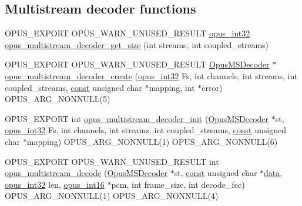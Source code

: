 \subsection*{Multistream decoder functions}
\begin{DoxyCompactItemize}
\item 
O\+P\+U\+S\+\_\+\+E\+X\+P\+O\+RT O\+P\+U\+S\+\_\+\+W\+A\+R\+N\+\_\+\+U\+N\+U\+S\+E\+D\+\_\+\+R\+E\+S\+U\+LT \hyperlink{opus__types_8h_aa4d309d6f80b99dbabebc8f98879ab9a}{opus\+\_\+int32} \hyperlink{group__opus__multistream_gad4e534e2ee78039fff01cd0c6f7c1dd1}{opus\+\_\+multistream\+\_\+decoder\+\_\+get\+\_\+size} (int streams, int coupled\+\_\+streams)
\item 
O\+P\+U\+S\+\_\+\+E\+X\+P\+O\+RT O\+P\+U\+S\+\_\+\+W\+A\+R\+N\+\_\+\+U\+N\+U\+S\+E\+D\+\_\+\+R\+E\+S\+U\+LT \hyperlink{group__opus__multistream_gad3497495deb9a8ace82e76cd4f93e0e4}{Opus\+M\+S\+Decoder} $\ast$ \hyperlink{group__opus__multistream_ga0dc5378a3d4c65498cf530e450b56aa1}{opus\+\_\+multistream\+\_\+decoder\+\_\+create} (\hyperlink{opus__types_8h_aa4d309d6f80b99dbabebc8f98879ab9a}{opus\+\_\+int32} Fs, int channels, int streams, int coupled\+\_\+streams, \hyperlink{zconf_8h_a2c212835823e3c54a8ab6d95c652660e}{const} unsigned char $\ast$mapping, int $\ast$error) O\+P\+U\+S\+\_\+\+A\+R\+G\+\_\+\+N\+O\+N\+N\+U\+LL(5)
\item 
O\+P\+U\+S\+\_\+\+E\+X\+P\+O\+RT int \hyperlink{group__opus__multistream_gac9680d4205a5ea95785e747f0d2e393b}{opus\+\_\+multistream\+\_\+decoder\+\_\+init} (\hyperlink{group__opus__multistream_gad3497495deb9a8ace82e76cd4f93e0e4}{Opus\+M\+S\+Decoder} $\ast$st, \hyperlink{opus__types_8h_aa4d309d6f80b99dbabebc8f98879ab9a}{opus\+\_\+int32} Fs, int channels, int streams, int coupled\+\_\+streams, \hyperlink{zconf_8h_a2c212835823e3c54a8ab6d95c652660e}{const} unsigned char $\ast$mapping) O\+P\+U\+S\+\_\+\+A\+R\+G\+\_\+\+N\+O\+N\+N\+U\+LL(1) O\+P\+U\+S\+\_\+\+A\+R\+G\+\_\+\+N\+O\+N\+N\+U\+LL(6)
\item 
O\+P\+U\+S\+\_\+\+E\+X\+P\+O\+RT O\+P\+U\+S\+\_\+\+W\+A\+R\+N\+\_\+\+U\+N\+U\+S\+E\+D\+\_\+\+R\+E\+S\+U\+LT int \hyperlink{group__opus__multistream_ga2db65790cd7e0890a031b2eb17452d7b}{opus\+\_\+multistream\+\_\+decode} (\hyperlink{group__opus__multistream_gad3497495deb9a8ace82e76cd4f93e0e4}{Opus\+M\+S\+Decoder} $\ast$st, \hyperlink{zconf_8h_a2c212835823e3c54a8ab6d95c652660e}{const} unsigned char $\ast$\hyperlink{jpeglib_8h_aa379dc8ae39e55ae0c431a61a7d2f2bc}{data}, \hyperlink{opus__types_8h_aa4d309d6f80b99dbabebc8f98879ab9a}{opus\+\_\+int32} len, \hyperlink{opus__types_8h_acc9ed7cf60479eb81f9648c6ec27dc26}{opus\+\_\+int16} $\ast$pcm, int frame\+\_\+size, int decode\+\_\+fec) O\+P\+U\+S\+\_\+\+A\+R\+G\+\_\+\+N\+O\+N\+N\+U\+LL(1) O\+P\+U\+S\+\_\+\+A\+R\+G\+\_\+\+N\+O\+N\+N\+U\+LL(4)

\end{DoxyCompactItemize}
